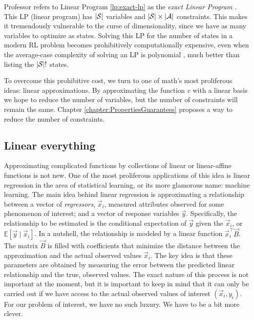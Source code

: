 Professor \citeauthor{farias2002thesis} refers to Linear Program
\eqref{lp:exact-lp} as the \textit{exact Linear Program}
\cite[Ch.~2.3]{farias2002thesis}. This LP (linear program) has $|\mathcal{S}|$
variables and $|\mathcal{S}| \times |\mathcal{A}|$ constraints. This makes it
tremendously vulnerable to the curse of dimensionality, since we have as many
variables to optimize as states. Solving this LP for the number of states in a
modern RL problem becomes prohibitively computationally expensive, even when the
average-case complexity of solving an LP is polynomial
\cite[pg.~147]{kochenderfer2022}, much better than listing the $|\mathcal{S}|!$
states.

To overcome this prohibitive cost, we turn to one of math's most proliferous
ideas: linear approximations. By approximating the function $v$ with a linear
basis we hope to reduce the number of variables, but the number of constraints
will remain the same. Chapter \ref{chapter:PropertiesGuarantees} proposes a way
to reduce the number of constraints.

\subsection{Linear everything}

Approximating complicated functions by collections of linear or linear-affine
functions is not new. One of the most proliferous applications of this idea is
linear regression in the area of statistical learning, or its more glamorous
name: machine learning. The main idea behind linear regression is approximating
a relationship between a vector of \textit{regressors}, $\vec{x}_i$, measured
attributes observed for some phenomenon of interest; and a vector of response
variables $\vec{y}$. Specifically, the relationship to be estimated is the
conditional expectation of $\vec{y}$ given the $\vec{x}_i$, or $\mathbb{E}
\left[ \vec{y} \mid \vec{x}_i \right]$. In a nutshell, the relationship is
modeled by a linear function $\vec{x}_{i}^{\top} \vec{B}$. The matrix $\vec{B}$
is filled with coefficients that minimize the distance between the approximation
and the actual observed values $\vec{x}_i$. The key idea is that these
parameters are obtained by measuring the error between the predicted linear
relationship and the true, observed values. The exact nature of this process is
not important at the moment, but it is important to keep in mind that it can
only be carried out if we have access to the actual observed values of interest
$(\vec{x}_i, y_i)$. For our problem of interest, we have no such luxury. We have
to be a bit more clever.

